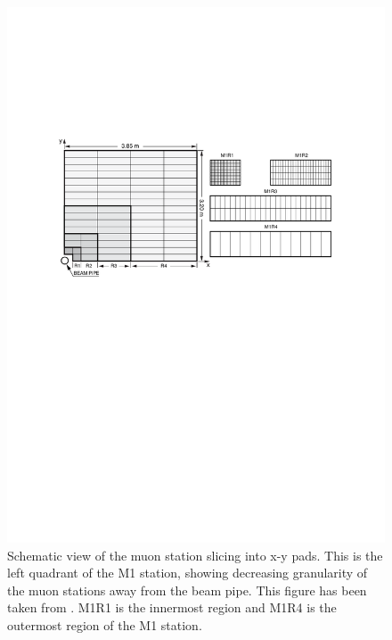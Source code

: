 \begin{figure}[!h]
        \centering
        \includegraphics[width = 1.0\textwidth]{figs/trimuon/fig2.pdf}
        \caption{Schematic view of the muon station slicing into x-y pads. This is the left quadrant of the M1 station, showing decreasing granularity of the muon stations away from the beam pipe. This figure has been taken from \cite{LHCb-DP-2012-002}. M1R1 is the innermost region and M1R4 is the outermost region of the M1 station. }
        \label{fig:pads}
\end{figure}



